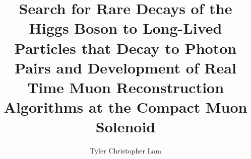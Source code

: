 \documentclass[PhD]{uclathes}
\title{
	Search for Rare Decays of the Higgs Boson to Long-Lived Particles that Decay to Photon Pairs and Development of Real Time Muon Reconstruction Algorithms at the Compact Muon Solenoid
}
\author{Tyler Christopher Lam}
\begin{document}
\makeintropages








\end{document}
